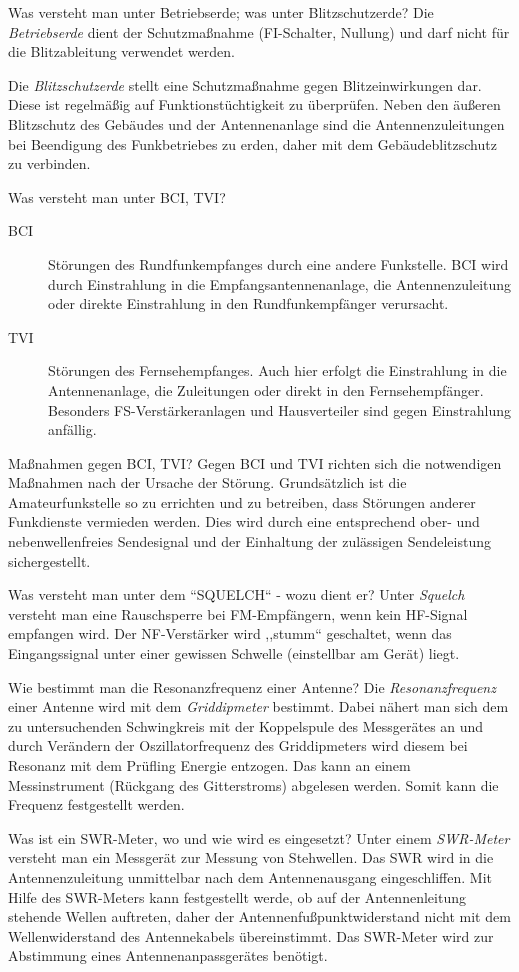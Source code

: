 \documentclass[avery5371,grid,frame,a4paper]{flashcards}
\newcommand{\card}[3]{
  \begin{flashcard}[{\chap} -- #1]{#2}#3\end{flashcard}
}
\begin{document}
\card{41}{Was versteht man unter Betriebserde; was unter Blitzschutzerde?}{
  Die \emph{Betriebserde} dient der Schutzmaßnahme (FI-Schalter, Nullung) und darf nicht für die Blitzableitung verwendet werden.

  Die \emph{Blitzschutzerde} stellt eine Schutzmaßnahme gegen Blitzeinwirkungen dar. Diese ist regelmäßig auf Funktionstüchtigkeit zu überprüfen. Neben den äußeren Blitzschutz des Gebäudes und der Antennenanlage sind die Antennenzuleitungen bei Beendigung des Funkbetriebes zu erden, daher mit dem Gebäudeblitzschutz zu verbinden.
}
\card{42}{Was versteht man unter BCI, TVI?}{
  \begin{description}
    \item[BCI] Störungen des Rundfunkempfanges durch eine andere Funkstelle. BCI wird durch Einstrahlung in die Empfangsantennenanlage, die Antennenzuleitung oder direkte Einstrahlung in den Rundfunkempfänger verursacht.
    \item[TVI] Störungen des Fernsehempfanges. Auch hier erfolgt die Einstrahlung in die Antennenanlage, die Zuleitungen oder direkt in den Fernsehempfänger. Besonders FS-Verstärkeranlagen und Hausverteiler sind gegen Einstrahlung anfällig.
  \end{description}
}
\card{43}{Maßnahmen gegen BCI, TVI?}{
  Gegen BCI und TVI richten sich die notwendigen Maßnahmen nach der Ursache der Störung.
  Grundsätzlich ist die Amateurfunkstelle so zu errichten und zu betreiben, dass Störungen anderer Funkdienste vermieden werden.
  Dies wird durch eine entsprechend ober- und nebenwellenfreies Sendesignal und der Einhaltung der zulässigen Sendeleistung sichergestellt.
}
\card{44}{Was versteht man unter dem ``SQUELCH`` - wozu dient er?}{
  Unter \emph{Squelch} versteht man eine Rauschsperre bei FM-Empfängern, wenn kein HF-Signal empfangen wird. Der NF-Verstärker wird ,,stumm`` geschaltet, wenn das Eingangssignal unter einer gewissen Schwelle (einstellbar am Gerät) liegt.
}
\card{45}{Wie bestimmt man die Resonanzfrequenz einer Antenne?}{
  Die \emph{Resonanzfrequenz} einer Antenne wird mit dem \emph{Griddipmeter} bestimmt.
  Dabei nähert man sich dem zu untersuchenden Schwingkreis mit der Koppelspule des Messgerätes an und durch Verändern der Oszillatorfrequenz des Griddipmeters wird diesem bei Resonanz mit dem Prüfling Energie entzogen. Das kann an einem Messinstrument (Rückgang des Gitterstroms) abgelesen werden. Somit kann die Frequenz festgestellt werden.
}
\card{46}{Was ist ein SWR-Meter, wo und wie wird es eingesetzt?}{
  Unter einem \emph{SWR-Meter} versteht man ein Messgerät zur Messung von Stehwellen. Das SWR wird in die Antennenzuleitung unmittelbar nach dem Antennenausgang eingeschliffen. Mit Hilfe des SWR-Meters kann festgestellt werde, ob auf der Antennenleitung stehende Wellen auftreten, daher der Antennenfußpunktwiderstand nicht mit dem Wellenwiderstand des Antennekabels übereinstimmt.
  Das SWR-Meter wird zur Abstimmung eines Antennenanpassgerätes benötigt.
}
\end{document}
